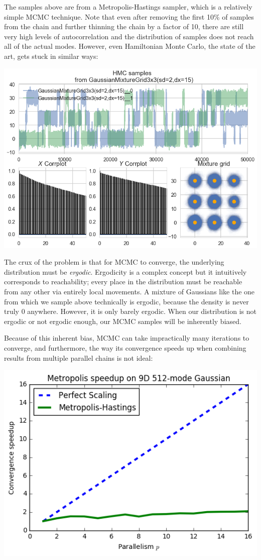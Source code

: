\documentclass{article}
\begin{document}
The samples above are from a Metropolis-Hastings sampler, which is a relatively
simple MCMC technique. Note that even after removing the first 10\% of samples
from the chain and further thinning the chain by a factor of 10, there are
still very high levels of autocorrelation and the distribution of samples does
not reach all of the actual modes.   However, even Hamiltonian Monte Carlo, the
state of the art, gets stuck in similar ways:

\includegraphics[width=\textwidth]{HMC-trace.png}

The crux of the problem is that for MCMC to converge, the underlying
distribution must be \textit{ergodic}. Ergodicity is a complex concept but it
intuitively corresponds to reachability; every place in the distribution must
be reachable from any other via entirely local movements. A mixture of
Gaussians like the one from which we sample above technically is ergodic,
because the density is never truly 0 anywhere. However, it is only barely
ergodic. When our distribution is not ergodic or not ergodic enough, our MCMC
samples will be inherently biased.

Because of this inherent bias, MCMC can take impractically many iterations to
converge, and furthermore, the way its convergence speeds up when combining
results from multiple parallel chains is not ideal:

\includegraphics[width=\textwidth]{mcmc-scaling.png}
\end{document}
